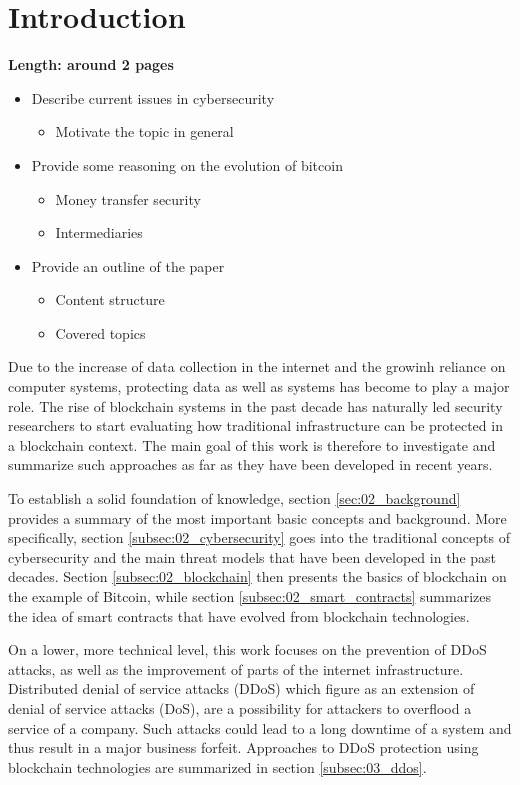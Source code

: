 \section{Introduction}

\textbf{Length: around 2 pages}

\begin{itemize}
  \item Describe current issues in cybersecurity
  \begin{itemize}
    \item Motivate the topic in general
  \end{itemize}
  \item Provide some reasoning on the evolution of bitcoin
  \begin{itemize}
    \item Money transfer security
    \item Intermediaries
  \end{itemize}
  \item Provide an outline of the paper
  \begin{itemize}
    \item Content structure
    \item Covered topics
  \end{itemize}
\end{itemize}

Due to the increase of data collection in the internet and the growinh reliance on computer systems, protecting data as well as systems has become to play a major role. The rise of blockchain systems in the past decade has naturally led security researchers to start evaluating how traditional infrastructure can be protected in a blockchain context. The main goal of this work is therefore to investigate and summarize such approaches as far as they have been developed in recent years.

To establish a solid foundation of knowledge, section \ref{sec:02_background} provides a summary of the most important basic concepts and background. More specifically, section \ref{subsec:02_cybersecurity} goes into the traditional concepts of cybersecurity and the main threat models that have been developed in the past decades. Section \ref{subsec:02_blockchain} then presents the basics of blockchain on the example of Bitcoin, while section \ref{subsec:02_smart_contracts} summarizes the idea of smart contracts that have evolved from blockchain technologies.

On a lower, more technical level, this work focuses on the prevention of DDoS attacks, as well as the improvement of parts of the internet infrastructure. Distributed denial of service attacks (DDoS) which figure as an extension of denial of service attacks (DoS), are a possibility for attackers to overflood a service of a company. Such attacks could lead to a long downtime of a system and thus result in a major business forfeit. Approaches to DDoS protection using blockchain technologies are summarized in section \ref{subsec:03_ddos}.

